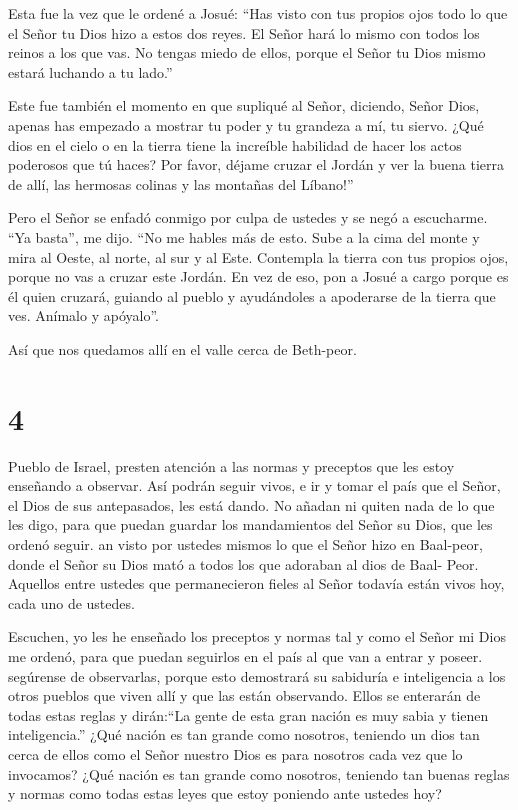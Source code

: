  Esta fue la vez que le ordené a Josué: ``Has visto con tus
propios ojos todo lo que el Señor tu Dios hizo a estos dos reyes. El
Señor hará lo mismo con todos los reinos a los que vas.  No
tengas miedo de ellos, porque el Señor tu Dios mismo estará luchando a
tu lado.''

 Este fue también el momento en que supliqué al Señor,
diciendo,  Señor Dios, apenas has empezado a mostrar tu
poder y tu grandeza a mí, tu siervo. ¿Qué dios en el cielo o en la
tierra tiene la increíble habilidad de hacer los actos poderosos que tú
haces?  Por favor, déjame cruzar el Jordán y ver la buena
tierra de allí, las hermosas colinas y las montañas del Líbano!''

 Pero el Señor se enfadó conmigo por culpa de ustedes y se
negó a escucharme. ``Ya basta'', me dijo. ``No me hables más de esto.
 Sube a la cima del monte y mira al Oeste, al norte, al sur
y al Este. Contempla la tierra con tus propios ojos, porque no vas a
cruzar este Jordán.  En vez de eso, pon a Josué a cargo
porque es él quien cruzará, guiando al pueblo y ayudándoles a apoderarse
de la tierra que ves. Anímalo y apóyalo''.

 Así que nos quedamos allí en el valle cerca de Beth-peor.

\hypertarget{section-3}{%
\section{4}\label{section-3}}

 Pueblo de Israel, presten atención a las normas y preceptos
que les estoy enseñando a observar. Así podrán seguir vivos, e ir y
tomar el país que el Señor, el Dios de sus antepasados, les está dando.
 No añadan ni quiten nada de lo que les digo, para que
puedan guardar los mandamientos del Señor su Dios, que les ordenó
seguir.  an visto por ustedes mismos lo que el Señor hizo en
Baal-peor, donde el Señor su Dios mató a todos los que adoraban al dios
de Baal- Peor.  Aquellos entre ustedes que permanecieron
fieles al Señor todavía están vivos hoy, cada uno de ustedes.

 Escuchen, yo les he enseñado los preceptos y normas tal y
como el Señor mi Dios me ordenó, para que puedan seguirlos en el país al
que van a entrar y poseer.  segúrense de observarlas, porque
esto demostrará su sabiduría e inteligencia a los otros pueblos que
viven allí y que las están observando. Ellos se enterarán de todas estas
reglas y dirán:``La gente de esta gran nación es muy sabia y tienen
inteligencia.''  ¿Qué nación es tan grande como nosotros,
teniendo un dios tan cerca de ellos como el Señor nuestro Dios es para
nosotros cada vez que lo invocamos?  ¿Qué nación es tan
grande como nosotros, teniendo tan buenas reglas y normas como todas
estas leyes que estoy poniendo ante ustedes hoy?

